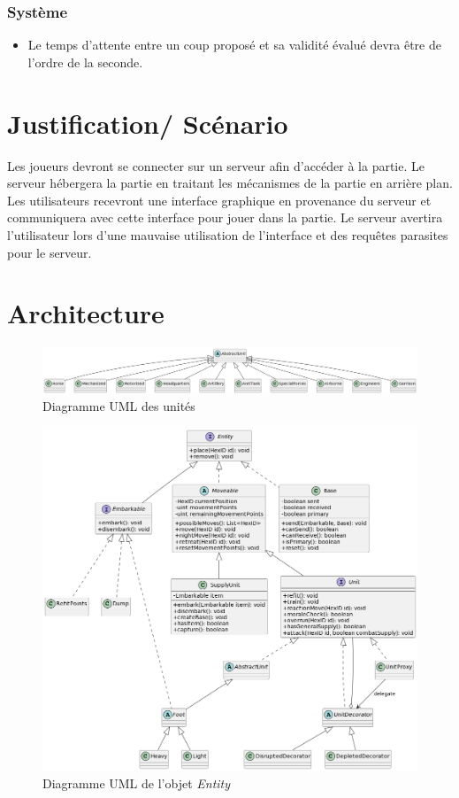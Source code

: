 \documentclass{article}[a4paper, 12pt]
\begin{document}
\subsubsection{Système}
\begin{itemize}
    \item Le temps d'attente entre un coup proposé et sa validité évalué devra être de l'ordre de la seconde.
\end{itemize}

\section{Justification/ Scénario}

Les joueurs devront se connecter sur un serveur afin d'accéder à la partie. Le serveur hébergera la partie en traitant les mécanismes de la partie en arrière plan. Les utilisateurs recevront une interface graphique en provenance du serveur et communiquera avec cette interface pour jouer dans la partie.
Le serveur avertira l'utilisateur lors d'une mauvaise utilisation de l'interface et des requêtes parasites pour le serveur.

\section{Architecture}


\begin{figure}[H]
\centering
\includegraphics[scale=0.3]{uml_abstract_unit.png}
\caption{Diagramme UML des unités}
\end{figure}

\begin{figure}[H]
\centering
\includegraphics[scale=0.3]{uml_entityV2.png}
\caption{Diagramme UML de l'objet \emph{Entity}}
\end{figure}
\end{document}
